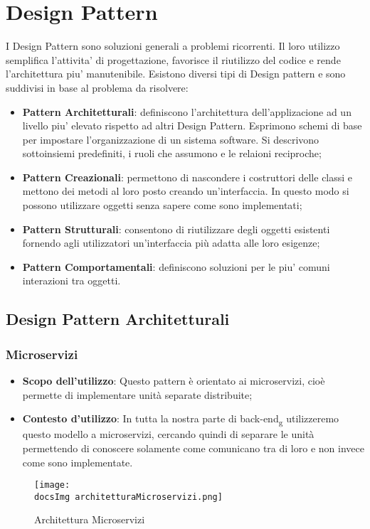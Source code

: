 \section{Design Pattern}
	I Design Pattern sono soluzioni generali a problemi ricorrenti. Il loro utilizzo semplifica l'attivita' di progettazione, favorisce il riutilizzo del codice e rende l'architettura piu' manutenibile. Esistono diversi tipi di Design pattern e sono suddivisi in base al problema da risolvere:
	\begin{itemize}\itemsep1pt
		\item \textbf{Pattern Architetturali}: definiscono l'architettura dell'applizacione ad un livello piu' elevato rispetto ad altri Design Pattern. Esprimono schemi di base per impostare l'organizzazione di un sistema software. Si descrivono sottoinsiemi predefiniti, i ruoli che assumono e le relaioni reciproche; 
		\item \textbf{Pattern Creazionali}: permettono di nascondere i costruttori delle classi e mettono dei metodi al loro posto creando un'interfaccia. In questo modo si possono utilizzare oggetti senza sapere come sono implementati;
		\item \textbf{Pattern Strutturali}: consentono di riutilizzare degli oggetti esistenti fornendo agli utilizzatori un'interfaccia più adatta alle loro esigenze;
		\item \textbf{Pattern Comportamentali}: definiscono soluzioni per le piu' comuni interazioni tra oggetti.
	\end{itemize} 
	
	\subsection{Design Pattern Architetturali}
		\subsubsection{Microservizi}
			\begin{itemize}
				\item\textbf{Scopo dell'utilizzo}: Questo pattern è orientato ai microservizi, cioè permette di implementare unità separate distribuite;
				\item\textbf{Contesto d'utilizzo}: In tutta la nostra parte di back-end\textsubscript{g} utilizzeremo questo modello a microservizi, cercando quindi di separare le unità permettendo di conoscere solamente come comunicano tra di loro e non invece come sono implementate.
			\end{itemize}
			\begin{center}
			\begin{figure}[H]
				\centering
				\texttt{[image: \\docsImg architetturaMicroservizi.png]}
				\caption{Architettura Microservizi}
				\label{Fig. Architettura a microservizi}
			\end{figure}
			\end{center}

